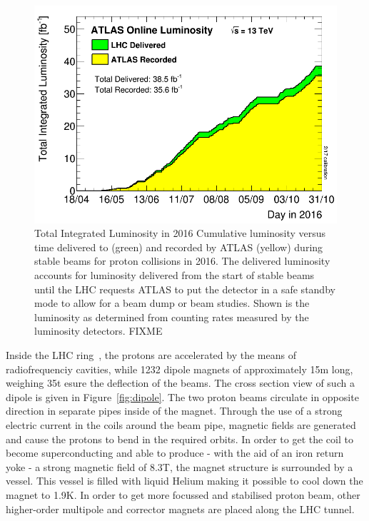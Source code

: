 \begin{figure}[ht]
\begin{minipage}[b]{0.4\textwidth}
\includegraphics[width=\textwidth]{2_ExperimentalSetup/Figures/sumLumiByDay}
	\caption{Total Integrated Luminosity in 2016 
		Cumulative luminosity versus time delivered to (green) and recorded by ATLAS (yellow) during stable beams for proton collisions  in 2016. The delivered luminosity accounts for luminosity delivered from the start of stable beams until the LHC requests ATLAS to put the detector in a safe standby mode to allow for a beam dump or beam studies. Shown is the luminosity as determined from counting rates measured by the luminosity detectors. FIXME}
	\end{minipage}
	\label{fig:IntLumi}
\end{figure}

 
Inside the LHC ring~\cite{Bruning:782076}, the protons are accelerated by the means of radiofrequenciy cavities, while 1232 dipole magnets of approximately 15\si{ \m} long, weighing 35\si{ \tonne} esure the deflection of the beams. The cross section view of such a dipole is given in Figure~\ref{fig:dipole}. The two proton beams circulate in opposite direction in separate pipes inside of the magnet. Through the use of a strong electric current in the coils around the beam pipe, magnetic fields are generated and cause the protons to bend in the required orbits. In order to get the coil to become superconducting and able to produce - with the aid of an iron return yoke - a strong magnetic field of 8.3\si{ \tesla}, the magnet structure is surrounded by a vessel. This vessel is filled with liquid Helium making it possible to cool down the magnet to 1.9\si{ \kelvin}. In order to get more focussed and stabilised proton beam, other higher-order multipole and corrector magnets are placed along the LHC tunnel.

